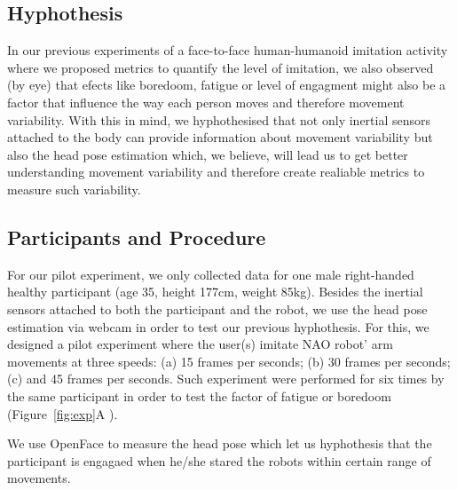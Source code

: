 \documentclass{sigchi}
\begin{document}
\subsection{Hyphothesis}
In our previous experiments of a face-to-face human-humanoid imitation
activity \cite{XXX2017} where we proposed metrics to quantify the level of
imitation, we also observed (by eye) that efects like boredoom, fatigue or
level of engagment might also be a factor that influence
the way each person moves and therefore movement variability.
With this in mind, we hyphothesised that not only inertial sensors attached
to the body can provide information about movement variability
but also the head pose estimation which, we believe, will lead us to get better
understanding movement variability and therefore create
realiable metrics to measure such variability.


\subsection{Participants and Procedure}
For our pilot experiment, we only collected data for one male right-handed healthy
participant  (age 35, height 177cm, weight 85kg).
Besides the inertial sensors attached to both the participant and the robot,
we use the head pose estimation via webcam in order to test our previous hyphothesis.
For this, we designed a pilot experiment where the user(s) imitate NAO robot' arm
movements at three speeds:
(a) 15 frames per seconds;
(b) 30 frames per seconds;
(c) and 45 frames per seconds.
Such experiment were performed for six times by the same participant
in order to test the factor of fatigue or boredoom (Figure~\ref{fig:exp}A ).


We use OpenFace \cite{Baltrusaitis2016} to measure the head pose which
 let us hyphothesis that the participant is engagaed
when he/she stared the robots within certain range of movements.



\end{document}
